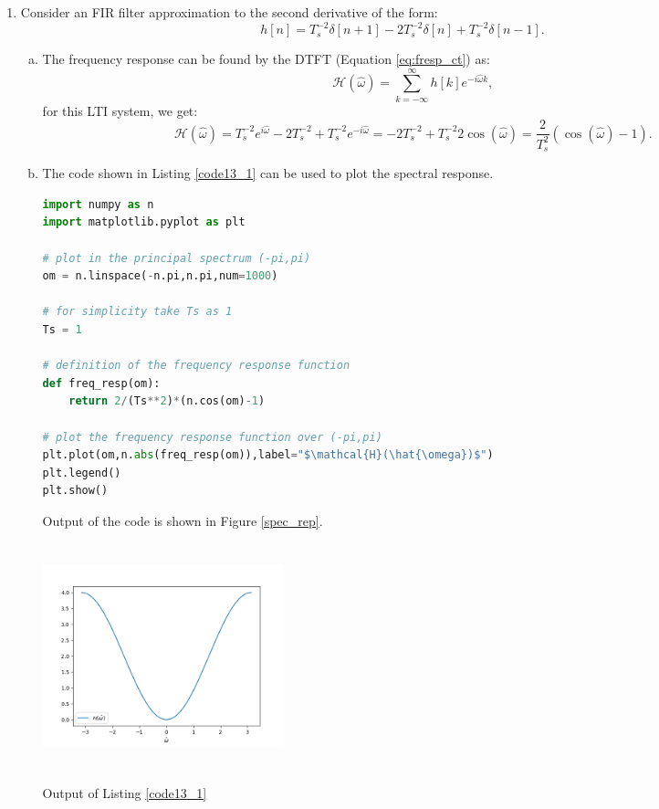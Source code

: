 \begin{enumerate}
\item Consider an FIR filter approximation to the second derivative of the form:
$$h[n]=T_{s}^{-2}\delta[n+1]-2T_{s}^{-2}\delta[n]+T_{s}^{-2}\delta[n-1].$$

\begin{enumerate}[a)]
\item The frequency response can be found by the DTFT (Equation \ref{eq:fresp_ct}) as:
$$\mathcal{H}(\hat{\omega})=\sum_{k=-\infty}^{\infty}h[k]e^{-i\hat{\omega}k},$$
for this LTI system, we get:
$$\mathcal{H}(\hat{\omega})=T_{s}^{-2}e^{i\hat{\omega}}-2T_{s}^{-2}+T_{s}^{-2}e^{-i\hat{\omega}}=-2T_{s}^{-2}+T_{s}^{-2}2\cos(\hat{\omega})=\frac{2}{T_{s}^{2}}(\cos(\hat{\omega})-1).$$

\item The code shown in Listing \ref{code13_1} can be used to plot the spectral response. 
\begin{lstlisting}[language=Python, caption=Frequency response for finite difference,label=code13_1]
import numpy as n
import matplotlib.pyplot as plt

# plot in the principal spectrum (-pi,pi)
om = n.linspace(-n.pi,n.pi,num=1000)

# for simplicity take Ts as 1
Ts = 1

# definition of the frequency response function
def freq_resp(om):
    return 2/(Ts**2)*(n.cos(om)-1)

# plot the frequency response function over (-pi,pi)
plt.plot(om,n.abs(freq_resp(om)),label="$\mathcal{H}(\hat{\omega})$")
plt.legend()
plt.show()
\end{lstlisting}
Output of the code is shown in Figure \ref{spec_rep}.
\begin{marginfigure}
    \includegraphics[width=7.0cm,height=6.5cm]{ch11/figures/freq13.png}
    \caption{Output of Listing \ref{code13_1}}
    \label{spec_rep}
\end{marginfigure}


\end{enumerate}
\end{enumerate}
